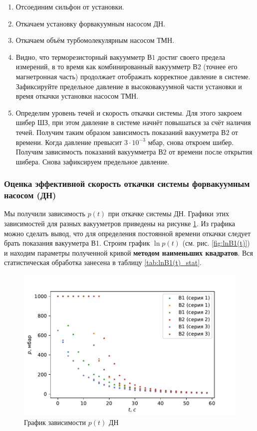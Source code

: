 \documentclass[12pt,a4paper]{article}
\begin{document}
\begin{enumerate}
	\item Отсоединим сильфон от установки.
	\item Откачаем установку форвакуумным насосом ДН.
	\item Откачаем объём турбомолекулярным насосом ТМН.
	\item Видно, что терморезисторный вакуумметр $В1$ достиг своего предела измерений, в то время как комбинированный вакуумметр $В2$ (точнее его магнетронная часть) продолжает отображать корректное давление в системе. Зафиксируйте предельное давление в высоковакуумной части установки и время откачки установки насосом ТМН.
	\item Определим уровень течей и скорость откачки системы. Для этого закроем шибер ШЗ, при этом давление в системе начнёт повышаться за счёт наличия течей. Получим таким образом зависимость показаний вакууметра $В2$ от времени. Когда давление превысит $3 \cdot 10^{-3}$ мбар,
	снова откроем шибер. Получим зависимость показаний вакуумметра $В2$ от времени после открытия шибера. Снова зафиксируем предельное давление.
\end{enumerate}

\subsubsection*{Оценка эффективной скорость откачки системы форвакуумным насосом (ДН)}
Мы получили зависимость $p(t)$ при откачке системы ДН. Графики этих зависимостей для разных вакууметров приведены на рисунке \ref{fig:p(t)}. Из графика можно сделать вывод, что для определения постоянной времени откачки следует брать показания вакууметра В1. Строим график $\ln{p}(t)$ (см. рис. \ref{fig:lnB1(t)}) и находим параметры полученной кривой \textbf{методом наименьших квадратов}. Вся статистическая обработка занесена в таблицу \ref{tab:lnB1(t)_stat}.


\begin{figure}[h]
	\centering
		\includegraphics[width = 11 cm]{res/p(t).pdf}
	\caption{График зависимости $p(t)$ ДН}
	\label{fig:p(t)}
\end{figure}
\end{document}
